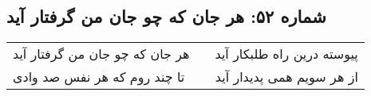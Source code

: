 \begin{center}
\section*{شماره ۵۲: هر جان که چو جان من گرفتار آید}
\label{sec:052}
\begin{longtable}{l p{0.5cm} r}
هر جان که چو جان من گرفتار آید
&&
پیوسته درین راه طلبکار آید
\\
تا چند روم که هر نفس صد وادی
&&
از هر سویم همی پدیدار آید
\\
\end{longtable}
\end{center}
